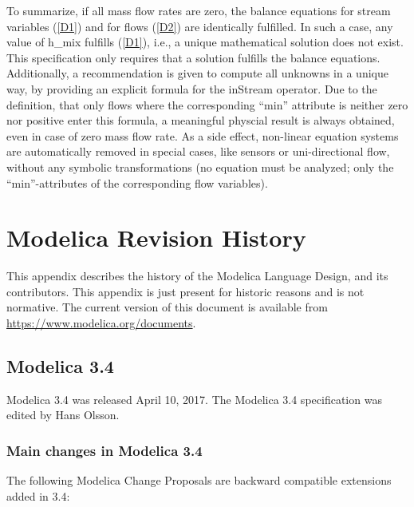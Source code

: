 \documentclass[10pt,a4paper]{report}
\def\doublelabel#1{\label{#1}}
\begin{document}
To summarize, if all mass flow rates are zero, the balance equations for
stream variables (\ref{D1}) and for flows (\ref{D2}) are identically fulfilled. In
such a case, any value of h\_mix fulfills (\ref{D1}), i.e., a unique
mathematical solution does not exist. This specification only requires
that a solution fulfills the balance equations. Additionally, a
recommendation is given to compute all unknowns in a unique way, by
providing an explicit formula for the inStream operator. Due to the
definition, that only flows where the corresponding ``min'' attribute is
neither zero nor positive enter this formula, a meaningful physcial
result is always obtained, even in case of zero mass flow rate. As a
side effect, non-linear equation systems are automatically removed in
special cases, like sensors or uni-directional flow, without any
symbolic transformations (no equation must be analyzed; only the
``min''-attributes of the corresponding flow variables).

\chapter{Modelica Revision History}\doublelabel{modelica-revision-history}

This appendix describes the history of the Modelica Language Design, and
its contributors. This appendix is just present for historic reasons and
is not normative. The current version of this document is available from
\url{https://www.modelica.org/documents}.

\section{Modelica 3.4}\doublelabel{modelica-3-4}
Modelica 3.4 was released April 10, 2017. The Modelica 3.4 specification
was edited by Hans Olsson.

\subsection{Main changes in Modelica 3.4}\doublelabel{main-changes-in-modelica-3-4}


The following Modelica Change Proposals are backward compatible
extensions added in 3.4:
\end{document}
